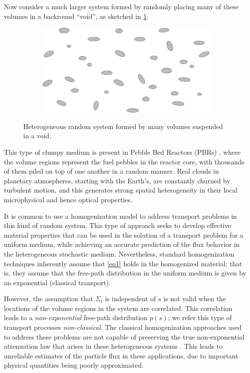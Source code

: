 \documentclass[12pt]{article}
\begin{document}
Now consider a much larger system formed by randomly placing many of these volumes in a backround ``void'', as sketched in \cref{fig2}.
\begin{figure}[hbt]
    \centering
    \begin{subfigure}{0.3\textwidth}
        \centering
        \includegraphics[width=\textwidth]{Fig2a}
    \end{subfigure}
    \caption{Heterogeneous random system formed by many volumes suspended in a void.}
    \label{fig2}
\end{figure}
This type of clumpy medium is present in Pebble Bed Reactors (PBRs) \cite{fragre11,vaslar14b}, where the volume regions represent the fuel pebbles in the reactor core, with thousands of them piled on top of one another in a random manner.  Real clouds in planetary atmospheres, starting with the Earth's, are constantly churned by turbulent motion, and this generates strong spatial heterogeneity in their local microphysical and hence optical properties.

It is common to use a homogenization model to address transport problems in this kind of random system.
This type of approach seeks to develop effective material properties that can be used in the solution of a transport problem for a uniform medium, while achieving an accurate prediction of the flux behavior in the heterogeneous stochastic medium.
Nevertheless, standard homogenization techniques inherently assume that \cref{eq1} holds in the homogenized material; that is, they assume that the free-path distribution in the uniform medium is given by an exponential (classical transport).

However, the assumption that $\Sigma_t$ is independent of $s$ is not valid when the locations of the volume regions in the system are correlated.
This correlation leads to a \textit{non-exponential} free-path distribution $p(s)$; we refer this type of transport processes \textit{non-classical}.
The classical homogenization approaches used to address these problems are not capable of preserving the true non-exponential attenuation law that arises in these heterogeneous systems \cite{larvas11,davxu14,vaslar14b,xudav16,vas13}.
This leads to unreliable estimates of the particle flux in these applications, due to important physical quantities being poorly approximated.
\end{document}
